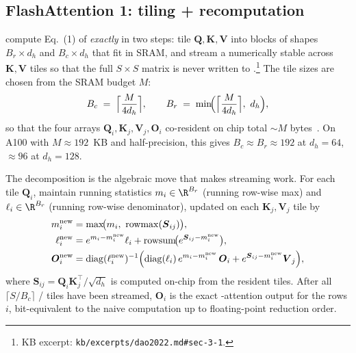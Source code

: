 \subsection{FlashAttention 1: tiling + recomputation}
\label{sec:fa1}

\citet{dao2022} compute Eq.~(1) of \citet{vaswani2017} \emph{exactly}
in two steps: tile $\boldsymbol{Q}, \boldsymbol{K}, \boldsymbol{V}$
into blocks of shapes $B_r \times d_h$ and $B_c \times d_h$ that fit in
SRAM, and stream a numerically stable \emph{} across
$\boldsymbol{K}, \boldsymbol{V}$ tiles so that the full $S \times S$
matrix is never written to .\footnote{KB excerpt:
\nolinkurl{kb/excerpts/dao2022.md#sec-3-1}.} The tile sizes are chosen
from the SRAM budget $M$:
\begin{equation}
  B_c \;=\; \Bigl\lceil \frac{M}{4 d_h} \Bigr\rceil,
  \qquad
  B_r \;=\; \min\!\Bigl(\Bigl\lceil \frac{M}{4 d_h} \Bigr\rceil,\ d_h\Bigr),
  \label{eq:fa1-tile}
\end{equation}
so that the four arrays
$\boldsymbol{Q}_i, \boldsymbol{K}_j, \boldsymbol{V}_j, \boldsymbol{O}_i$
co-resident on chip total $\sim\!M$
bytes~\citep[Algorithm~1]{dao2022}. On A100 with $M \approx 192$~KB and
half-precision, this gives $B_c \approx B_r \approx 192$ at $d_h = 64$,
$\approx 96$ at $d_h = 128$.

The  decomposition is the algebraic move that makes
streaming work. For each  tile $\boldsymbol{Q}_i$, maintain
running statistics $m_i \in \R^{B_r}$ (running row-wise max) and
$\ell_i \in \R^{B_r}$ (running row-wise  denominator), updated
on each $\boldsymbol{K}_j, \boldsymbol{V}_j$ tile by~\citep[\S
3.1]{dao2022}
\begin{equation}
\begin{aligned}
  m_i^{\text{new}} &= \max\!\bigl(m_i,\ \mathrm{rowmax}(\boldsymbol{S}_{ij})\bigr), \\
  \ell_i^{\text{new}} &= e^{m_i - m_i^{\text{new}}} \ell_i
                       + \mathrm{rowsum}\!\bigl(e^{\boldsymbol{S}_{ij} - m_i^{\text{new}}}\bigr), \\
  \boldsymbol{O}_i^{\text{new}} &= \mathrm{diag}(\ell_i^{\text{new}})^{-1}
        \Bigl(\mathrm{diag}(\ell_i)\, e^{m_i - m_i^{\text{new}}}\, \boldsymbol{O}_i
              + e^{\boldsymbol{S}_{ij} - m_i^{\text{new}}} \boldsymbol{V}_j \Bigr),
\end{aligned}
\label{eq:online-softmax}
\end{equation}
where $\boldsymbol{S}_{ij} = \boldsymbol{Q}_i \boldsymbol{K}_j^\top /
\sqrt{d_h}$ is computed on-chip from the resident tiles. After all
$\lceil S / B_c \rceil$ / tiles have been streamed,
$\boldsymbol{O}_i$ is the exact -attention output for the 
rows $i$, bit-equivalent to the naive computation up to floating-point
reduction order.

